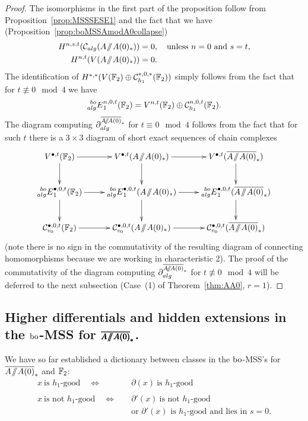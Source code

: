 \begin{proof}
The isomorphisms in the first part of the proposition follow from Proposition~\ref{prop:MSSSESE1} and the fact that we have (Proposition~\ref{prop:boMSSAmodA0collapse})
\begin{align*}
H^{n,s,t}(\mathcal{C}_{alg}(A \! \sslash \! A(0)_*)) & = 0, \quad \text{unless $n = 0$ and $s = t$}, \\
H^{n,t}(V(A \! \sslash \! A(0)_*)) & = 0.
\end{align*}
The identification of $H^{*,*}(V(\mathbb{F}_2)\oplus \mathcal{C}_{h_1}^{*,0,*}(\mathbb{F}_2))$ simply follows from the fact that for $t \not\equiv 0 \mod 4$ we have
\[ \prescript{bo}{alg}{E}_1^{n,{0}, t}(\mathbb{F}_2) = V^{n,t}(\mathbb{F}_2)\oplus \mathcal{C}_{h_1}^{n,0,t}(\mathbb{F}_2). \]
The diagram computing $\partial^{\AA0}_{alg}$ for $t \equiv 0 \mod 4$ follows from the fact that for such $t$ there is a $3\times 3$ diagram of short exact sequences of chain complexes
$$
\xymatrix{
V^{\bullet,t}(\FF_2) \ar[r] \ar[d] &
V^{\bullet,t}(A \mmod A(0)_*) \ar[r] \ar[d] &
V^{\bullet,t}(\AA0) \ar[d] 
\\
\E{bo}{alg}_1^{\bullet,0,t}(\FF_2) \ar[r] \ar[d] &
\E{bo}{alg}_1^{\bullet,0,t}(A \mmod A(0)_*) \ar[r] \ar[d] &
\E{bo}{alg}_1^{\bullet,0,t}(\AA0) \ar[d] 
\\
\mc{C}_{v_0}^{\bullet,0,t}(\FF_2) \ar[r] &
\mc{C}_{v_0}^{\bullet,0,t}(A \mmod A(0)_*) \ar[r] &
\mc{C}_{v_0}^{\bullet,0,t}(\AA0) 
}
$$
(note there is no sign in the commutativity of the resulting diagram of connecting homomorphisms because we are working in characteristic 2).
The proof of the commutativity of the diagram computing $\partial_{alg}^{\AA0}$ for $t \not\equiv 0 \mod 4$ will be deferred to the next subsection (Case~(1) of Theorem~\ref{thm:AA0}, $r = 1$).
\end{proof}

\subsection*{Higher differentials and hidden extensions in the $\mathrm{bo}$-MSS for $\pmb{\AA0}$.}

We have so far established a dictionary between classes in the $\mathrm{bo}$-MSS's for $\AA0$ and $\mathbb{F}_2$:
\begin{align*}
x \: \text{is $h_1$-good} \quad \Leftrightarrow \quad & \partial(x) \: \text{is $h_1$-good} \\
\\
x \: \text{is not $h_1$-good} \quad \Leftrightarrow \quad & \partial'(x) \: \text{is not $h_1$-good} \\
& \text{or $\partial'(x)$ is $h_1$-good and lies in $s = 0$.}
\end{align*}

